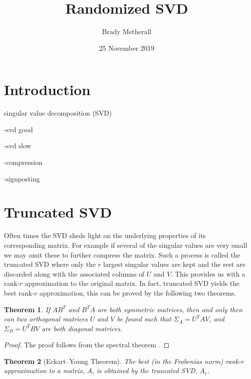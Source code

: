\documentclass[11pt, a4paper, twocolumn]{article}
\title{Randomized SVD}
\author{Brady Metherall}
\date{25 November 2019}
\newtheorem{theorem}{Theorem}
\begin{document}
\maketitle



\section{Introduction}

singular value decomposition (SVD)

-svd good

-svd slow

-compression

-signposting

\section{Truncated SVD}
Often times the SVD sheds light on the underlying properties of its corresponding matrix. For example if several of the singular values are very small we may omit these to further compress the matrix. Such a process is called the truncated SVD where only the $r$ largest singular values are kept and the rest are discarded along with the associated columns of $U$ and $V$. This provides us with a rank-$r$ approximation to the original matrix. In fact, truncated SVD yields the best rank-$r$ approximation, this can be proved by the following two theorems.
\begin{theorem}
    If $AB^T$ and $B^TA$ are both symmetric matrices, then and only then can two orthogonal matrices $U$ and $V$ be found such that $\Sigma_A = U^T A V$, and $\Sigma_B = U^T B V$ are both diagonal matrices.
    \label{thm:symm}
\end{theorem}
\begin{proof}
    The proof follows from the spectral theorem \cite{axler}.
\end{proof}
\begin{theorem}[Eckart--Young Theorem]
    The best (in the Frobenius norm) rank-$r$ approximation to a matrix, $A$, is obtained by the truncated SVD, $A_r$.
    \label{thm:frob}
\end{theorem}
\end{document}
